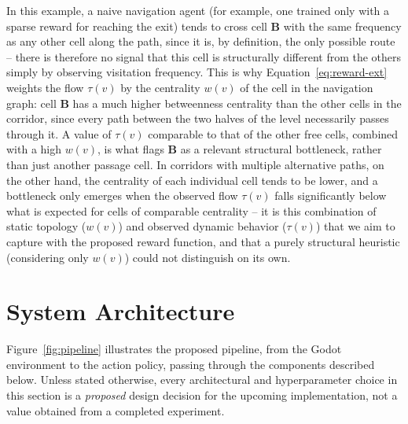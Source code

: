 \documentclass[sigconf,nonacm,language=english]{acmart}
\begin{document}
In this example, a naive navigation agent (for example, one trained only
with a sparse reward for reaching the exit) tends to cross cell
\textbf{B} with the same frequency as any other cell along the path, since
it is, by definition, the only possible route -- there is therefore no
signal that this cell is structurally different from the others simply by
observing visitation frequency. This is why Equation~\eqref{eq:reward-ext}
weights the flow $\tau(v)$ by the centrality $w(v)$ of the cell in the
navigation graph: cell \textbf{B} has a much higher betweenness centrality
than the other cells in the corridor, since every path between the two
halves of the level necessarily passes through it. A value of $\tau(v)$
comparable to that of the other free cells, combined with a high $w(v)$, is
what flags \textbf{B} as a relevant structural bottleneck, rather than just
another passage cell. In corridors with multiple alternative paths, on the
other hand, the centrality of each individual cell tends to be lower, and a
bottleneck only emerges when the observed flow $\tau(v)$ falls
significantly below what is expected for cells of comparable centrality --
it is this combination of static topology ($w(v)$) and observed dynamic
behavior ($\tau(v)$) that we aim to capture with the proposed reward
function, and that a purely structural heuristic (considering only $w(v)$)
could not distinguish on its own.

\section{System Architecture}
\label{sec:arquitetura}

Figure~\ref{fig:pipeline} illustrates the proposed pipeline, from the Godot
environment to the action policy, passing through the components described
below. Unless stated otherwise, every architectural and hyperparameter
choice in this section is a \emph{proposed} design decision for the
upcoming implementation, not a value obtained from a completed experiment.
\end{document}
